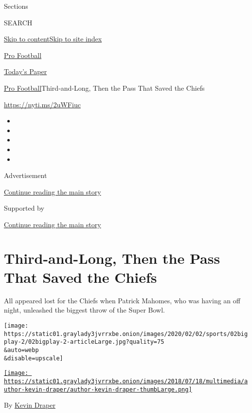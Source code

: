 Sections

SEARCH

\protect\hyperlink{site-content}{Skip to
content}\protect\hyperlink{site-index}{Skip to site index}

\href{https://www.nytimes3xbfgragh.onion/section/sports/football}{Pro
Football}

\href{https://myaccount.nytimes3xbfgragh.onion/auth/login?response_type=cookie\&client_id=vi}{}

\href{https://www.nytimes3xbfgragh.onion/section/todayspaper}{Today's
Paper}

\href{/section/sports/football}{Pro Football}\textbar{}Third-and-Long,
Then the Pass That Saved the Chiefs

\url{https://nyti.ms/2uWFiuc}

\begin{itemize}
\item
\item
\item
\item
\item
\end{itemize}

Advertisement

\protect\hyperlink{after-top}{Continue reading the main story}

Supported by

\protect\hyperlink{after-sponsor}{Continue reading the main story}

\hypertarget{third-and-long-then-the-pass-that-saved-the-chiefs}{%
\section{Third-and-Long, Then the Pass That Saved the
Chiefs}\label{third-and-long-then-the-pass-that-saved-the-chiefs}}

All appeared lost for the Chiefs when Patrick Mahomes, who was having an
off night, unleashed the biggest throw of the Super Bowl.

\texttt{[image: https://static01.graylady3jvrrxbe.onion/images/2020/02/02/sports/02bigplay-2/02bigplay-2-articleLarge.jpg?quality=75\\\&auto=webp\\\&disable=upscale]}

\href{https://www.nytimes3xbfgragh.onion/by/kevin-draper}{\texttt{[image: https://static01.graylady3jvrrxbe.onion/images/2018/07/18/multimedia/author-kevin-draper/author-kevin-draper-thumbLarge.png]}}

By \href{https://www.nytimes3xbfgragh.onion/by/kevin-draper}{Kevin
Draper}

